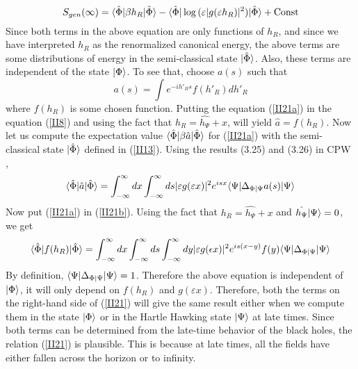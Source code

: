 \documentclass[12pt]{article}
\DeclarePairedDelimiter\bra{\langle}{\rvert}
\DeclarePairedDelimiter\ket{\lvert}{\rangle}
\begin{document}
 \begin{equation}\label{II21}
S_{gen}(\infty)= \bra{\hat{\Phi}}\beta h_{R}\ket{\hat{\Phi}}-\bra{\hat{\Phi}} \log{(\varepsilon |g(\varepsilon h_R)|^2)}\ket{\hat{\Phi}}+ \textrm{Const}
 \end{equation}
 Since both terms in the above equation are only functions of $h_{R}$, and since we have interpreted $h_{R}$ as the renormalized canonical energy, the above terms are some distributions of energy in the semi-classical state $\ket{\hat{\Phi}}$. Also, these terms are independent of the state $\ket{\Phi}$. To see that, choose $a(s)$ such that
 \begin{equation}\label{II21a}
 a(s)=\int e^{-ih'_{R}s} f(h'_{R}) dh'_{R}
 \end{equation}
where $f(h_{R})$ is some chosen function. Putting the equation (\ref{II21a}) in the equation (\ref{II8}) and using the fact that $h_R=\hat{h_{\Psi}}+x$, will yield $\hat{a}= f(h_R)$. Now let us compute the expectation value $\bra{\hat{\Phi}}\beta \hat{a}\ket{\hat{\Phi}}$ for (\ref{II21a}) with the semi-classical state $\ket{\hat{\Phi}}$ defined in (\ref{II13}). Using the results (3.25) and (3.26) in CPW \cite{VGE},
  \begin{equation}\label{II21b}
  \bra{\hat{\Phi}}\hat{a}\ket{\hat{\Phi}}= \int_{-\infty}^{\infty}dx \int_{-\infty}^{\infty}ds |\varepsilon g(\varepsilon x)|^2 e^{isx} \bra{\Psi}\Delta_{\Phi|\Psi}a(s)\ket{\Psi}
  \end{equation}
 Now put (\ref{II21a}) in (\ref{II21b}). Using the fact that $h_R=\hat{h_{\Psi}}+x$ and $\hat{h_{\Psi}}\ket{\Psi}=0$, we get
 \begin{equation}\label{II21c}
 \bra{\hat{\Phi}} f(h_R) \ket{\hat{\Phi}}= \int_{-\infty}^{\infty}dx \int_{-\infty}^{\infty}ds \int_{-\infty}^{\infty} dy |\varepsilon g(\epsilon x)|^2 e^{is(x-y)} f(y) \bra{\Psi}\Delta_{\Phi|\Psi}\ket{\Psi}
\end{equation}
By definition, $\bra{\Psi}\Delta_{\Phi|\Psi}\ket{\Psi}=1$. Therefore the above equation is independent of $\ket{\Phi}$, it will only depend on $f(h_R)$ and $g(\varepsilon x)$. Therefore, both the terms on the right-hand side of (\ref{II21}) will give the same result either when we compute them in the state $\ket{\Phi}$ or in the Hartle Hawking state $\ket{\Psi}$ at late times.
Since both terms can be determined from the late-time behavior of the black holes, the relation (\ref{II21}) is plausible.
This is because at late times, all the fields have either fallen across the horizon or to infinity.
 \\
\end{document}
